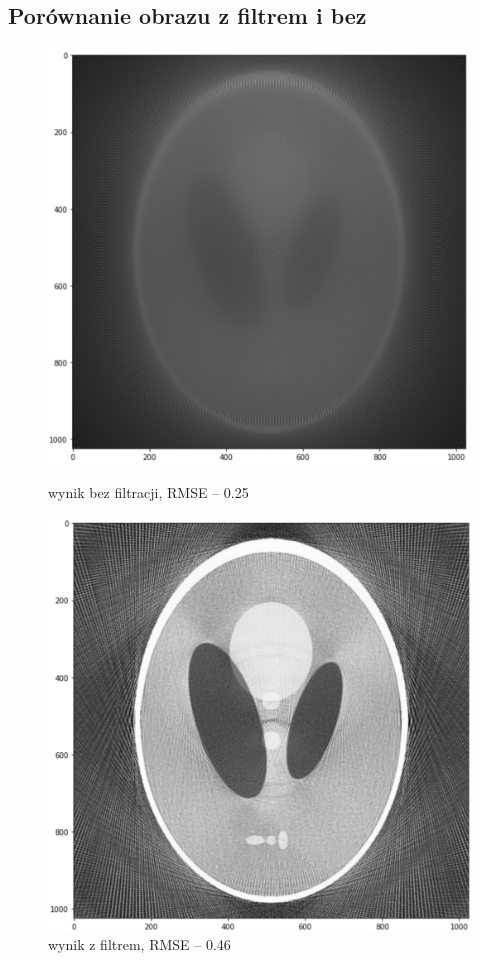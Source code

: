 \documentclass[polish,polish,a4paper]{article}
\begin{document}
		\subsection{Porównanie obrazu z filtrem i bez}
			\begin{figure}[!h]
				\centering
				\begin{minipage}{0.45\linewidth}
					\includegraphics[width=\linewidth]{img/shepp_nf.png}
					\caption{wynik bez filtracji, RMSE -- 0.25}
				\end{minipage}
				\hfill
				\begin{minipage}{0.45\linewidth}
					\includegraphics[width=\linewidth]{img/shepp_f.png}
					\caption{wynik z filtrem, RMSE -- 0.46}
				\end{minipage}
			\end{figure}
			
\end{document}
